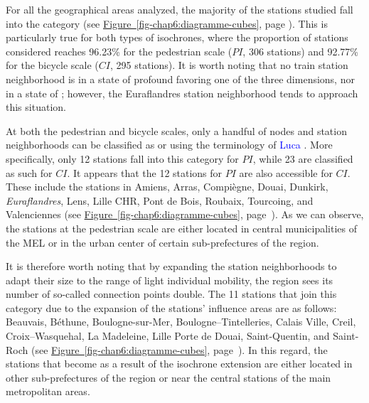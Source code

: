 \begin{refsegment}
For all the geographical areas analyzed, the majority of the stations studied fall into the  category (see \hyperref[fig-chap6:diagramme-cubes]{Figure~\ref{fig-chap6:diagramme-cubes}}, page \pageref{fig-chap6:diagramme-cubes}). This is particularly true for both types of isochrones, where the proportion of stations considered  reaches 96.23\% for the pedestrian scale (\(PI\), 306 stations) and 92.77\% for the bicycle scale (\(CI\), 295 stations). It is worth noting that no train station neighborhood is in a state of profound  favoring one of the three dimensions, nor in a state of ; however, the Euraflandres station neighborhood tends to approach this situation.%

At both the pedestrian and bicycle scales, only a handful of nodes and station neighborhoods can be classified as  or  using the terminology of \textcolor{blue}{Luca} \textcolor{blue}{\textcite[202]{bertolini_spatial_1999}}. More specifically, only 12 stations fall into this category for \(PI\), while 23 are classified as such for \(CI\). It appears that the 12  stations for \(PI\) are also accessible for \(CI\). These include the stations in Amiens, Arras, Compiègne, Douai, Dunkirk, \textsl{Euraflandres}, Lens, Lille CHR, Pont de Bois, Roubaix, Tourcoing, and Valenciennes (see \hyperref[fig-chap6:diagramme-cubes]{Figure~\ref{fig-chap6:diagramme-cubes}}, page~\pageref{fig-chap6:diagramme-cubes}). As we can observe, the  stations at the pedestrian scale are either located in central municipalities of the \acrfull{MEL} or in the urban center of certain sub-prefectures of the region.%

It is therefore worth noting that by expanding the station neighborhoods to adapt their size to the range of light individual mobility, the region sees its number of so-called  connection points double. The 11 stations that join this category due to the expansion of the stations' influence areas are as follows: Beauvais, Béthune, Boulogne-sur-Mer, Boulogne–Tintelleries, Calais Ville, Creil, Croix–Wasquehal, La Madeleine, Lille Porte de Douai, Saint-Quentin, and Saint-Roch (see \hyperref[fig-chap6:diagramme-cubes]{Figure~\ref{fig-chap6:diagramme-cubes}}, page~\pageref{fig-chap6:diagramme-cubes}). In this regard, the stations that become  as a result of the isochrone extension are either located in other sub-prefectures of the region or near the central stations of the main metropolitan areas.%


\end{refsegment}
